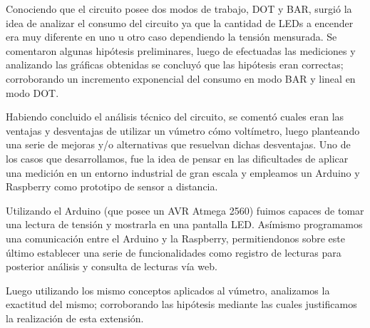 \documentclass[12pt,a4paper]{article}
\begin{document}
	Conociendo que el circuito posee dos modos de trabajo, DOT y BAR, surgió la idea de analizar el consumo del circuito ya que la cantidad de LEDs a encender era muy diferente en uno u otro caso dependiendo la tensión mensurada. Se comentaron algunas hipótesis preliminares, luego de efectuadas las mediciones y analizando las gráficas obtenidas se concluyó que las hipótesis eran correctas; corroborando un incremento exponencial del consumo en modo BAR y lineal en modo DOT.

	Habiendo concluido el análisis técnico del circuito, se comentó cuales eran las ventajas y desventajas de utilizar un vúmetro cómo voltímetro, luego planteando una serie de mejoras y/o alternativas que resuelvan dichas desventajas. Uno de los casos que desarrollamos, fue la idea de pensar en las dificultades de aplicar una medición en un entorno industrial de gran escala y empleamos un Arduino y Raspberry como prototipo de sensor a distancia.

	Utilizando el Arduino (que posee un AVR Atmega 2560) fuimos capaces de tomar una lectura de tensión y mostrarla en una pantalla LED. Asímismo programamos una comunicación entre el Arduino y la Raspberry, permitiendonos sobre este último establecer una serie de funcionalidades como registro de lecturas para posterior análisis y consulta de lecturas vía web.

	Luego utilizando los mismo conceptos aplicados al vúmetro, analizamos la exactitud del mismo; corroborando las hipótesis mediante las cuales justificamos la realización de esta extensión.


	\newpage
\end{document}
